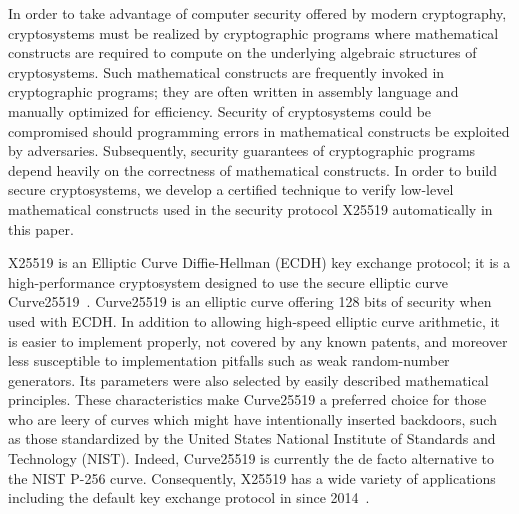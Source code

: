 
In order to take advantage of computer security offered by modern 
cryptography, 
cryptosystems must be realized by cryptographic programs where mathematical
constructs are required to compute on the underlying algebraic
structures of cryptosystems.
Such mathematical constructs are frequently invoked in cryptographic
programs; they are often written in assembly language and
manually optimized for efficiency. 
Security of cryptosystems could be compromised should programming
errors in mathematical constructs be exploited by adversaries.
Subsequently, security guarantees of cryptographic programs
depend heavily on the correctness of mathematical constructs.
In order to build secure cryptosystems, we develop a certified
technique to verify low-level mathematical constructs used in the
security protocol X25519 automatically in this paper.

X25519 is an Elliptic Curve Diffie-Hellman (ECDH) key exchange
protocol; it is a high-performance cryptosystem designed to 
use the secure elliptic curve Curve25519~\cite{Ber06}. Curve25519 is an elliptic
curve offering 128 bits of security when used with ECDH. In addition
to allowing high-speed elliptic curve arithmetic, it is easier to
implement properly, not covered by any known patents, and moreover
less susceptible to implementation pitfalls such as weak 
random-number generators. Its parameters were also selected by
easily described mathematical principles.
These characteristics make Curve25519 a
preferred choice for those who are leery of curves which might have
intentionally inserted
backdoors, such as those standardized by the United States National
Institute of Standards and Technology (NIST). 
Indeed, Curve25519 is currently the
de facto alternative to the NIST P-256 curve. Consequently, X25519 has
a wide variety of applications including the default key exchange
protocol in \openssh since 2014~\cite{W:17:C}.

